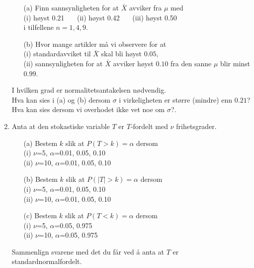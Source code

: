\begin{enumerate}
\begin{itemize}
  \item[(a)]  Finn sannsynligheten for at $\bar X$ avviker fra
               $\mu$ med \\
                  (i) høyst 0.21 \ \ \  (ii) høyst 0.42 \ \ \
                  (iii) høyst 0.50\\
                   i tilfellene $n=1,4,9$.
  \item[(b)]  Hvor mange artikler må vi observere for at \\
                  (i) standardavviket til $\bar X$ skal
               bli høyst $0.05$, \\ (ii) sannsynligheten for at
               $\bar X$ avviker høyst $0.10$ 
               fra den sanne $\mu$ blir minst $0.99$.
 \end{itemize}
          I hvilken grad er normalitetsantakelsen nødvendig.\\
          Hva kan sies i (a) og (b) dersom $\sigma$ i
          virkeligheten er større (mindre) enn $0.21$?
          Hva kan sies dersom vi overhodet ikke vet noe om $\sigma$?.

\item     Anta at den stokastiske variable $T$ er $T$-fordelt med
          $\nu$ frihetsgrader.
 \begin{itemize}
  \item[(a)]  Bestem $k$ slik at $P(T> k)=\alpha$ dersom\\
                  (i)   $\nu$=5,   $\alpha$=0.01, 0.05, 0.10\\
                  (ii)  $\nu$=10,  $\alpha$=0.01, 0.05, 0.10
  \item[(b)]  Bestem $k$ slik at $P(\mid T\mid > k)=\alpha$
               dersom\\
                  (i)   $\nu$=5,   $\alpha$=0.01, 0.05, 0.10\\
                  (ii)  $\nu$=10,  $\alpha$=0.01, 0.05, 0.10
  \item[(c)]  Bestem $k$ slik at $P(T<k)=\alpha$ dersom\\
                  (i)    $\nu$=5,    $\alpha$=0.05, 0.975\\
                  (ii)  $\nu$=10,   $\alpha$=0.05, 0.975
 \end{itemize}
          Sammenlign svarene med det du får ved å
          anta at $T$ er standardnormalfordelt.


\end{enumerate}
